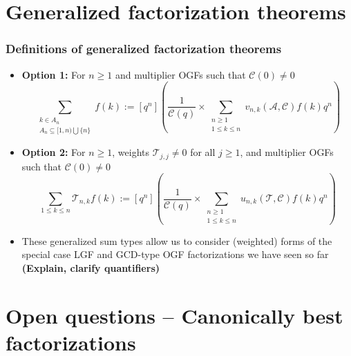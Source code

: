 \section{Generalized factorization theorems}

\begin{frame}
\frametitle{Definitions of generalized factorization theorems}

\small
\begin{itemize} 

\item \textbf{Option 1:} 
      For $n \geq 1$ and multiplier OGFs such that $\mathcal{C}(0) \neq 0$
      \[
      \sum_{\substack{k \in A_n \\ A_n \subseteq [1, n) \bigcup \{n\}}} f(k) := 
		[q^n]\left(\frac{1}{\mathcal{C}(q)} \times \sum_{\substack{n \geq 1 \\ 1 \leq k \leq n}} 
		v_{n,k}(\mathcal{A}, \mathcal{C}) f(k) q^n\right) 	
      \]
\pause\item \textbf{Option 2:} 
      For $n \geq 1$, weights $\mathcal{T}_{j,j} \neq 0$ for all $j \geq 1$, and 
      multiplier OGFs such that $\mathcal{C}(0) \neq 0$
      \[
      \sum_{1 \leq k \leq n} \mathcal{T}_{n,k}f(k) := 
		[q^n]\left(\frac{1}{\mathcal{C}(q)} \times \sum_{\substack{n \geq 1 \\ 1 \leq k \leq n}} 
		u_{n,k}(\mathcal{T}, \mathcal{C}) f(k) q^n\right) 	
      \]
\pause\item These generalized sum types allow us to consider (weighted) forms of the 
      special case LGF and GCD-type OGF factorizations we have seen so far 
      \textbf{(Explain, clarify quantifiers)}

\end{itemize}

\end{frame}

\section{Open questions -- Canonically best factorizations}

